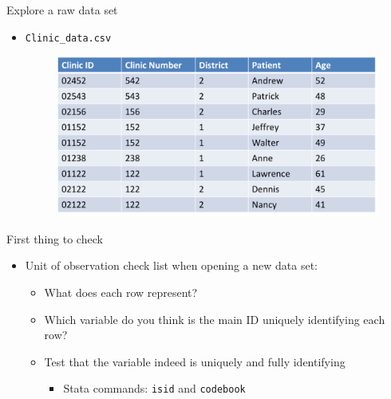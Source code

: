 \documentclass[aspectratio=169]{beamer}
\begin{document}
\begin{frame}{Explore a raw data set}
	\begin{itemize}
		\item \texttt{Clinic\_data.csv}
		\begin{figure}
			\centering
			\includegraphics[width=\linewidth]{img/raw2}
		\end{figure}
	\end{itemize}
\end{frame}


\begin{frame}{First thing to check}
	\begin{itemize}
		\item Unit of observation check list when opening a new data set:
		\begin{itemize}
			\item What does each row represent?
			\item Which variable do you think is the main ID uniquely identifying each row?
			\item Test that the variable indeed is uniquely and fully identifying
			\begin{itemize}
				\item Stata commands: \texttt{isid} and \texttt{codebook}
			\end{itemize}
		\end{itemize}
	\end{itemize}
\end{frame}
\end{document}
